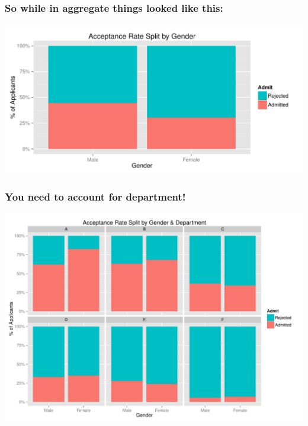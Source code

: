 \documentclass[slides]{beamer}\usepackage[]{graphicx}\usepackage[]{color}
\begin{document}
\begin{frame}
\frametitle{So while in aggregate things looked like this:}

\begin{center}
\includegraphics[width=\textwidth]{gender-accpt.pdf}
\end{center}

\end{frame}



\begin{frame}
\frametitle{You need to account for department!}

\begin{center}
\includegraphics[width=\textwidth]{split-accpt.pdf}
\end{center}

\end{frame}
\end{document}
